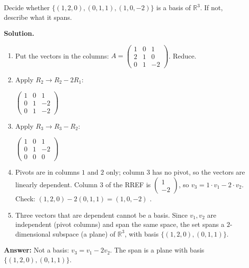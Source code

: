\documentclass[11pt]{article}
\begin{document}
\begin{tcolorbox}[breakable,colback=white,colframe=ink!60,title={\bfseries Example 2 \textperiodcentered\ Is a set a basis of $\mathbb{R}^{3}$?}]Decide whether $\{(1,2,0),(0,1,1),(1,0,-2)\}$ is a basis of $\mathbb{R}^{3}$. If not, describe what it spans.
\par\smallskip
\textbf{Solution.} \begin{enumerate}[leftmargin=1.6em,itemsep=1pt,topsep=2pt,label=\arabic*.]\item Put the vectors in the columns: $A=\begin{pmatrix}1 & 0 & 1 \\ 2 & 1 & 0 \\ 0 & 1 & -2\end{pmatrix}$. Reduce.
\item Apply $R_2\to R_2-2R_1$:\par\smallskip $\displaystyle \begin{pmatrix}1 & 0 & 1 \\ 0 & 1 & -2 \\ 0 & 1 & -2\end{pmatrix}$
\item Apply $R_3\to R_3-R_2$:\par\smallskip $\displaystyle \begin{pmatrix}1 & 0 & 1 \\ 0 & 1 & -2 \\ 0 & 0 & 0\end{pmatrix}$
\item Pivots are in columns $1$ and $2$ only; column $3$ has no pivot, so the vectors are linearly dependent. Column $3$ of the RREF is $\begin{pmatrix}1\\-2\end{pmatrix}$, so $v_3=1\cdot v_1-2\cdot v_2$. Check: $(1,2,0)-2(0,1,1)=(1,0,-2)$ \checkmark.
\item Three vectors that are dependent cannot be a basis. Since $v_1,v_2$ are independent (pivot columns) and span the same space, the set spans a $2$-dimensional subspace (a plane) of $\mathbb{R}^{3}$, with basis $\{(1,2,0),(0,1,1)\}$.
\end{enumerate}\textbf{Answer:} Not a basis: $v_3=v_1-2v_2$. The span is a plane with basis $\{(1,2,0),(0,1,1)\}$.
\end{tcolorbox}
\end{document}
